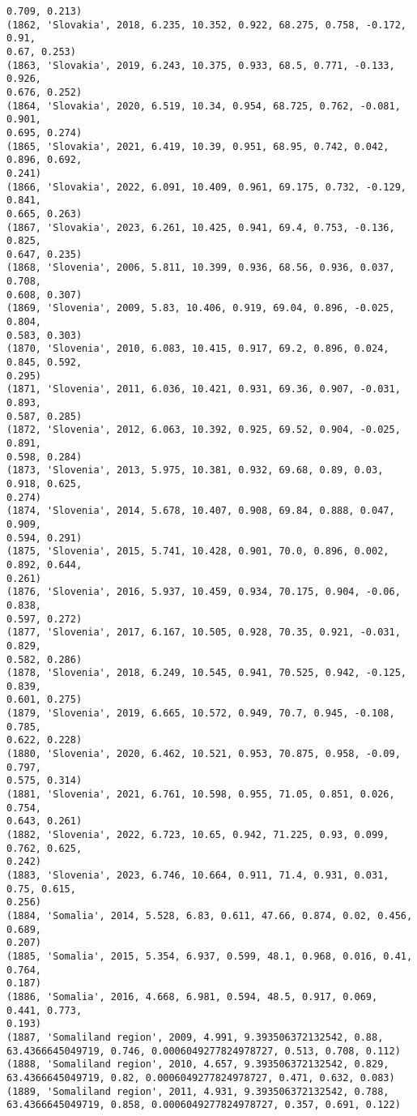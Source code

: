 \documentclass[11pt]{article}
\begin{document}
\begin{Verbatim}[commandchars=\\\{\}]
0.709, 0.213)
(1862, 'Slovakia', 2018, 6.235, 10.352, 0.922, 68.275, 0.758, -0.172, 0.91,
0.67, 0.253)
(1863, 'Slovakia', 2019, 6.243, 10.375, 0.933, 68.5, 0.771, -0.133, 0.926,
0.676, 0.252)
(1864, 'Slovakia', 2020, 6.519, 10.34, 0.954, 68.725, 0.762, -0.081, 0.901,
0.695, 0.274)
(1865, 'Slovakia', 2021, 6.419, 10.39, 0.951, 68.95, 0.742, 0.042, 0.896, 0.692,
0.241)
(1866, 'Slovakia', 2022, 6.091, 10.409, 0.961, 69.175, 0.732, -0.129, 0.841,
0.665, 0.263)
(1867, 'Slovakia', 2023, 6.261, 10.425, 0.941, 69.4, 0.753, -0.136, 0.825,
0.647, 0.235)
(1868, 'Slovenia', 2006, 5.811, 10.399, 0.936, 68.56, 0.936, 0.037, 0.708,
0.608, 0.307)
(1869, 'Slovenia', 2009, 5.83, 10.406, 0.919, 69.04, 0.896, -0.025, 0.804,
0.583, 0.303)
(1870, 'Slovenia', 2010, 6.083, 10.415, 0.917, 69.2, 0.896, 0.024, 0.845, 0.592,
0.295)
(1871, 'Slovenia', 2011, 6.036, 10.421, 0.931, 69.36, 0.907, -0.031, 0.893,
0.587, 0.285)
(1872, 'Slovenia', 2012, 6.063, 10.392, 0.925, 69.52, 0.904, -0.025, 0.891,
0.598, 0.284)
(1873, 'Slovenia', 2013, 5.975, 10.381, 0.932, 69.68, 0.89, 0.03, 0.918, 0.625,
0.274)
(1874, 'Slovenia', 2014, 5.678, 10.407, 0.908, 69.84, 0.888, 0.047, 0.909,
0.594, 0.291)
(1875, 'Slovenia', 2015, 5.741, 10.428, 0.901, 70.0, 0.896, 0.002, 0.892, 0.644,
0.261)
(1876, 'Slovenia', 2016, 5.937, 10.459, 0.934, 70.175, 0.904, -0.06, 0.838,
0.597, 0.272)
(1877, 'Slovenia', 2017, 6.167, 10.505, 0.928, 70.35, 0.921, -0.031, 0.829,
0.582, 0.286)
(1878, 'Slovenia', 2018, 6.249, 10.545, 0.941, 70.525, 0.942, -0.125, 0.839,
0.601, 0.275)
(1879, 'Slovenia', 2019, 6.665, 10.572, 0.949, 70.7, 0.945, -0.108, 0.785,
0.622, 0.228)
(1880, 'Slovenia', 2020, 6.462, 10.521, 0.953, 70.875, 0.958, -0.09, 0.797,
0.575, 0.314)
(1881, 'Slovenia', 2021, 6.761, 10.598, 0.955, 71.05, 0.851, 0.026, 0.754,
0.643, 0.261)
(1882, 'Slovenia', 2022, 6.723, 10.65, 0.942, 71.225, 0.93, 0.099, 0.762, 0.625,
0.242)
(1883, 'Slovenia', 2023, 6.746, 10.664, 0.911, 71.4, 0.931, 0.031, 0.75, 0.615,
0.256)
(1884, 'Somalia', 2014, 5.528, 6.83, 0.611, 47.66, 0.874, 0.02, 0.456, 0.689,
0.207)
(1885, 'Somalia', 2015, 5.354, 6.937, 0.599, 48.1, 0.968, 0.016, 0.41, 0.764,
0.187)
(1886, 'Somalia', 2016, 4.668, 6.981, 0.594, 48.5, 0.917, 0.069, 0.441, 0.773,
0.193)
(1887, 'Somaliland region', 2009, 4.991, 9.393506372132542, 0.88,
63.4366645049719, 0.746, 0.0006049277824978727, 0.513, 0.708, 0.112)
(1888, 'Somaliland region', 2010, 4.657, 9.393506372132542, 0.829,
63.4366645049719, 0.82, 0.0006049277824978727, 0.471, 0.632, 0.083)
(1889, 'Somaliland region', 2011, 4.931, 9.393506372132542, 0.788,
63.4366645049719, 0.858, 0.0006049277824978727, 0.357, 0.691, 0.122)

\end{Verbatim}
\end{document}
